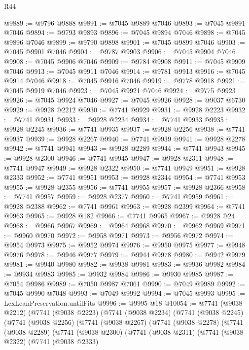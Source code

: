 \begin{lexlean}{R44}
\begin{coremodule}
{@9889 := @9796 @9888
@9891 := @7045 @9889 @7046
@9893 := @7045 @9891 @7046
@9894 := @9793 @9893
@9896 := @7045 @9894 @7046
@9898 := @7045 @9896 @7046
@9899 := @9790 @9898
@9901 := @7045 @9899 @7046
@9903 := @7045 @9901 @7046
@9904 := @9787 @9903
@9906 := @7045 @9904 @7046
@9908 := @7045 @9906 @7046
@9909 := @9784 @9908
@9911 := @7045 @9909 @7046
@9913 := @7045 @9911 @7046
@9914 := @9781 @9913
@9916 := @7045 @9914 @7046
@9918 := @7045 @9916 @7046
@9919 := @9778 @9918
@9921 := @7045 @9919 @7046
@9923 := @7045 @9921 @7046
@9924 := @9775 @9923
@9926 := @7045 @9924 @7046
@9927 := @7045 @9926
@9928 := @9037 @6730
@9929 := @9928 @2212
@9930 := @7741 @9929
@9931 := @9928 @2223
@9932 := @7741 @9931
@9933 := @9928 @2234
@9934 := @7741 @9933
@9935 := @9928 @2245
@9936 := @7741 @9935
@9937 := @9928 @2256
@9938 := @7741 @9937
@9939 := @9928 @2267
@9940 := @7741 @9939
@9941 := @9928 @2278
@9942 := @7741 @9941
@9943 := @9928 @2289
@9944 := @7741 @9943
@9945 := @9928 @2300
@9946 := @7741 @9945
@9947 := @9928 @2311
@9948 := @7741 @9947
@9949 := @9928 @2322
@9950 := @7741 @9949
@9951 := @9928 @2333
@9952 := @7741 @9951
@9953 := @9928 @2344
@9954 := @7741 @9953
@9955 := @9928 @2355
@9956 := @7741 @9955
@9957 := @9928 @2366
@9958 := @7741 @9957
@9959 := @9928 @2377
@9960 := @7741 @9959
@9961 := @9928 @2388
@9962 := @7741 @9961
@9963 := @9928 @2399
@9964 := @7741 @9963
@9965 := @9928 @182
@9966 := @7741 @9965
@9967 := @9928 @24
@9968 := @9966 @9967
@9969 := @9964 @9968
@9970 := @9962 @9969
@9971 := @9960 @9970
@9972 := @9958 @9971
@9973 := @9956 @9972
@9974 := @9954 @9973
@9975 := @9952 @9974
@9976 := @9950 @9975
@9977 := @9948 @9976
@9978 := @9946 @9977
@9979 := @9944 @9978
@9980 := @9942 @9979
@9981 := @9940 @9980
@9982 := @9938 @9981
@9983 := @9936 @9982
@9984 := @9934 @9983
@9985 := @9932 @9984
@9986 := @9930 @9985
@9987 := @7054 @9986
@9989 := @7050 @9987 @7061
@9990 := @7049 @9989
@9992 := @7045 @9990 @7048
@9993 := @7049 @9992
@9994 := @7045 @9993
@9995 := LexLeanPreservation.untilFits
@9996 := @9995 @18
@10054 := @7741
    (@9038 @2212)
    (@7741
      (@9038 @2223)
      (@7741
        (@9038 @2234)
        (@7741
          (@9038 @2245)
          (@7741
            (@9038 @2256)
            (@7741
              (@9038 @2267)
              (@7741
                (@9038 @2278)
                (@7741
                  (@9038 @2289)
                  (@7741
                    (@9038 @2300)
                    (@7741
                      (@9038 @2311)
                      (@7741
                        (@9038 @2322)
                        (@7741
                          (@9038 @2333)
}
\end{coremodule}
\end{lexlean}
